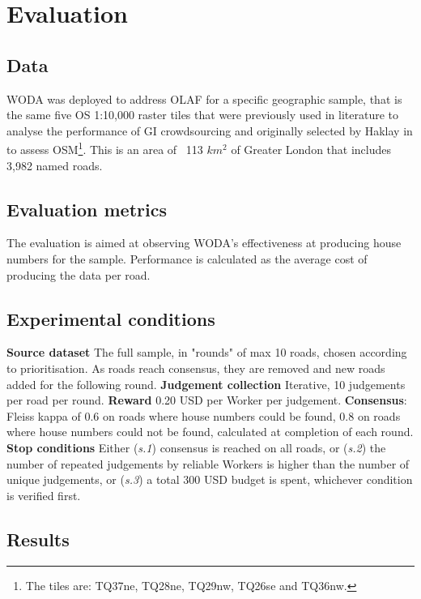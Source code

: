 \section{Evaluation}

\subsection{Data}

WODA was deployed to address OLAF for a specific geographic sample, that is the same five OS 1:10,000 raster tiles that were previously used in literature to analyse the performance of GI crowdsourcing and originally selected by Haklay in \cite{Haklay:2010vs} to assess OSM\footnote{The tiles are: TQ37ne, TQ28ne, TQ29nw, TQ26se and TQ36nw.}. This is an area of ~113 $ km^2 $ of Greater London that includes 3,982 named roads. 

\subsection{Evaluation metrics}

The evaluation is aimed at observing WODA's effectiveness at producing house numbers for the sample. Performance is calculated as the average cost of producing the data per road. 

\subsection{Experimental conditions}

\textbf{Source dataset} The full sample, in "rounds" of max 10 roads, chosen according to prioritisation. As roads reach consensus, they are removed and new roads added for the following round.
\textbf{Judgement collection} Iterative, 10 judgements per road per round.
\textbf{Reward} 0.20 USD per Worker per judgement.
\textbf{Consensus}: Fleiss kappa of 0.6 on roads where house numbers could be found, 0.8 on roads where house numbers could not be found, calculated at completion of each round. 
\textbf{Stop conditions} Either ({\it s.1}) consensus is reached on all roads, or ({\it s.2}) the number of repeated judgements by reliable Workers is higher than the number of unique judgements, or ({\it s.3}) a total 300 USD budget is spent, whichever condition is verified first.

\subsection{Results}

